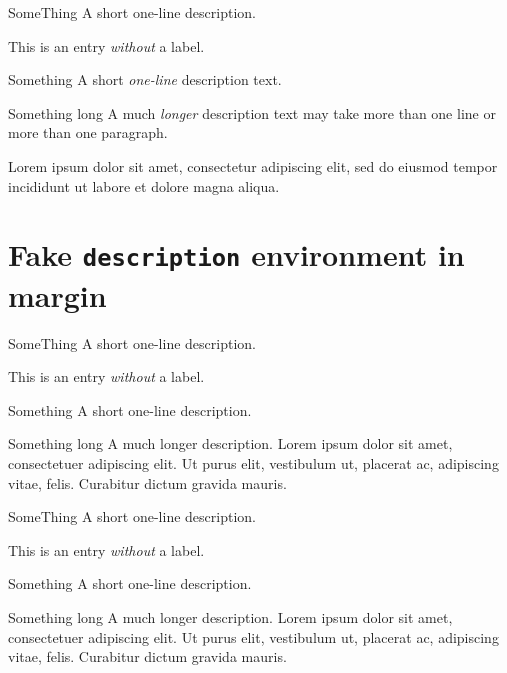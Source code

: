 \documentclass{article}
\newlength{\descitemwd}
\begin{document}
\begin{enumext*}[label={},labelwidth=\descitemwd,list-indent=0pt,font=\bfseries,noitemsep,topsep=3pt]
  \item[SomeThing] A short one-line description.
  \item[] This is an entry \emph{without} a label.
  \item[Something] A short \emph{one-line} description text.
  \item[Something long] A much \emph{longer} description text may take
    more than one line or more than one paragraph.

    Lorem ipsum dolor sit amet, consectetur adipiscing elit, sed do eiusmod
    tempor incididunt ut labore et dolore magna aliqua.
\end{enumext*}

\section{Fake \texttt{description} environment in margin}

\begin{enumext}[align=right, label={},labelsep=4pt,labelwidth=\descitemwd,list-offset={-\descitemwd-4pt}, font=\bfseries,noitemsep,topsep=3pt]
  \item[SomeThing] A short one-line description.
  \item This is an entry \textit{without} a label.
  \item[Something] A short one-line description.
  \item[Something long] A much longer description. Lorem ipsum dolor sit amet, consectetuer adipiscing elit.
    Ut purus elit, vestibulum ut, placerat ac, adipiscing vitae, felis.
    Curabitur dictum gravida mauris.
\end{enumext}

\begin{enumext*}[align=right, label={},labelsep=4pt,labelwidth=\descitemwd,list-offset={-\descitemwd-4pt}, font=\bfseries,noitemsep,topsep=3pt]
  \item[SomeThing] A short one-line description.
  \item This is an entry \textit{without} a label.
  \item[Something] A short one-line description.
  \item[Something long] A much longer description. Lorem ipsum dolor sit amet, consectetuer adipiscing elit.
    Ut purus elit, vestibulum ut, placerat ac, adipiscing vitae, felis.
    Curabitur dictum gravida mauris.
\end{enumext*}
\end{document}
